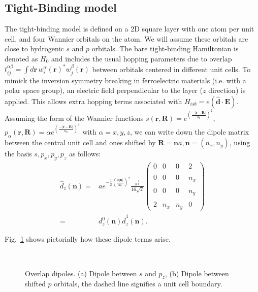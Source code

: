 \subsection{Tight-Binding model}
The tight-binding model is defined on a 2D square layer with one atom per unit cell, and four Wannier orbitals on the atom. We will assume these orbitals are close to hydrogenic $s$ and $p$ orbitals. The bare tight-binding Hamiltonian is denoted as $H_0$ and includes the usual hopping parameters due to overlap $t^{\alpha\beta}_{ij} = \int d\mathbf{r} \,w^{\alpha}_i(\mathbf{r})^*w^{\beta}_j(\mathbf{r})$ between orbitals centered in different unit cells. To mimick the inversion symmetry breaking in ferroelectric materials (i.e. with a polar space group), an electric field perpendicular to the layer ($z$ direction) is applied.
This allows extra hopping terms associated with $H_{isb} = e (\hat{\bm{d}}\cdot \bm{E})$. Assuming the form of the Wannier functions $s(\bm{r},\bm{R}) = e^{\left(\frac{-|\bm{r}-\bm{R}|}{a_0}\right)^2}$, $p_\alpha(\bm{r},\bm{R}) = \alpha e^{\left(\frac{-|\bm{r}-\bm{R}|}{a_0}\right)^2}$ with $\alpha = x,y,z$, we can write down the dipole matrix between the central unit cell and ones shifted by $\bm{R}=\bm{n}a, \bm{n}=(n_x,n_y)$, using the basis $s, p_x, p_y, p_z$ as follows:
\begin{align}
	\label{eq:dipole}
	\hat{d}_z(\bm{n}) =& ae^{-\frac{1}{2}\left(\frac{a|\bm{n}|}{a_0}\right)^2}\frac{\pi^{\frac{3}{2}}}{16\sqrt{2}}\left(\begin{matrix}0&0&0&2\\\\0&0&0&n_x\\\\0&0&0&n_y\\\\2&n_x&n_y&0\end{matrix}\right)\\
	=&d_z^0(\bm{n})\hat{d}^1_z(\bm{n}).
\end{align}

Fig.~\ref{fig:overlapdip} shows pictorially how these dipole terms arise. 
\begin{figure}[t]
~\centering
{}\caption{\label{fig:overlapdip} Overlap dipoles. (a) Dipole between $s$ and $p_z$, (b) Dipole between shifted $p$ orbitals, the dashed line signifies a unit cell boundary.}
\end{figure}


